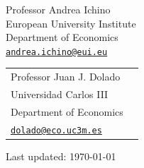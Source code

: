 \documentclass[letterpaper]{article}
\begin{document}
\begin{minipage}{0.45\linewidth}
	Professor Andrea Ichino \\
	European University Institute \\
	Department of Economics \\
	 \href{mailto:andrea.ichino@eui.eu}{\tt andrea.ichino@eui.eu}
\end{minipage}
\begin{minipage}{0.45\linewidth}
	\begin{tabular}{ll}
		Professor Juan J. Dolado \\
		Universidad Carlos III \\
		Department of Economics \\
		\href{mailto:dolado@eco.uc3m.es}{\tt dolado@eco.uc3m.es}
	\end{tabular}
\end{minipage}

\bigskip
\bigskip
\begin{flushright}
  \begin{footnotesize}
    Last updated: \today \\
  \end{footnotesize}
\end{flushright}
\end{document}
